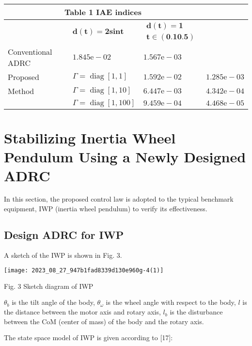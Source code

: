 \documentclass[10pt]{article}
\begin{document}
\begin{center}
\begin{tabular}{llll}
\multicolumn{3}{c}{Table 1 IAE indices} &  \\
\hline
 & $\boldsymbol{d}(\boldsymbol{t})=\mathbf{2 s i n} \boldsymbol{t}$ & $\begin{array}{l}\boldsymbol{d}(\boldsymbol{t})=\mathbf{1} \\ \boldsymbol{t} \in(\mathbf{0 . 1} \mathbf{0 . 5})\end{array}$ &  \\
\hline
Conventional ADRC & $1.845 \mathrm{e}-02$ & $1.567 \mathrm{e}-03$ &  \\
Proposed & $\Gamma=\operatorname{diag}[1,1]$ & $1.592 \mathrm{e}-02$ & $1.285 \mathrm{e}-03$ \\
Method & $\Gamma=\operatorname{diag}[1,10]$ & $6.447 \mathrm{e}-03$ & $4.342 \mathrm{e}-04$ \\
 & $\Gamma=\operatorname{diag}[1,100]$ & $9.459 \mathrm{e}-04$ & $4.468 \mathrm{e}-05$ \\
\hline
\end{tabular}
\end{center}

\section{Stabilizing Inertia Wheel Pendulum Using a Newly Designed ADRC}
In this section, the proposed control law is adopted to the typical benchmark equipment, IWP (inertia wheel pendulum) to verify its effectiveness.

\subsection{Design ADRC for IWP}
A sketch of the IWP is shown in Fig. 3.

\begin{center}
\texttt{[image: 2023\_08\_27\_947b1fad8339d130e960g-4(1)]}
\end{center}

Fig. 3 Sketch diagram of IWP

$\theta_{b}$ is the tilt angle of the body, $\theta_{\omega}$ is the wheel angle with respect to the body, $l$ is the distance between the motor axis and rotary axis, $l_{b}$ is the disturbance between the CoM (center of mass) of the body and the rotary axis.

The state space model of IWP is given according to [17]:
\end{document}
